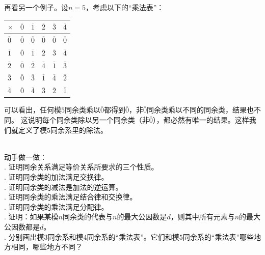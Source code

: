 \documentclass[12pt,UTF8]{ctexbook}
\begin{document}
再看另一个例子。设$n=5$，考虑以下的“乘法表”：
\begin{center}
    \begin{tabular}{ | p{2em}<{\centering} | p{2em}<{\centering} | p{2em}<{\centering} | p{2em}<{\centering} | p{2em}<{\centering} | p{2em}<{\centering} | }
        \hline
            $\times$   & $\overline{0}$ & $\overline{1}$ & $\overline{2}$ & $\overline{3}$ & $\overline{4}$ \\ [0.5ex] 
        \hline
        $\overline{0}$ & $\overline{0}$ & $\overline{0}$ & $\overline{0}$ & $\overline{0}$ & $\overline{0}$ \\  
        \hline
        $\overline{1}$ & $\overline{0}$ & $\overline{1}$ & $\overline{2}$ & $\overline{3}$ & $\overline{4}$ \\
        \hline
        $\overline{2}$ & $\overline{0}$ & $\overline{2}$ & $\overline{4}$ & $\overline{1}$ & $\overline{3}$ \\
        \hline
        $\overline{3}$ & $\overline{0}$ & $\overline{3}$ & $\overline{1}$ & $\overline{4}$ & $\overline{2}$ \\
        \hline 
        $\overline{4}$ & $\overline{0}$ & $\overline{4}$ & $\overline{3}$ & $\overline{2}$ & $\overline{1}$ \\
        \hline
    \end{tabular}
\end{center}

可以看出，任何模$5$同余类乘以$\overline{0}$都得到$\overline{0}$，非$\overline{0}$同余类乘以不同的同余类，结果也不同。
这说明每个同余类除以另一个同余类（非$\overline{0}$），都必然有唯一的结果。这样我们就定义了模$5$同余系里的除法。

\begin{xt}\label{xt:3-0-0}
    \mbox{}\\
    动手做一做：\\
    . 证明同余关系满足等价关系所要求的三个性质。 \\
    . 证明同余类的加法满足交换律。 \\
    . 证明同余类的减法是加法的逆运算。\\
    . 证明同余类的乘法满足结合律和交换律。\\
    . 证明同余类的乘法满足分配律。\\
    . 证明：如果某模$n$同余类的代表与$n$的最大公因数是$d$，则其中所有元素与$n$的最大公因数都是$d$。\\
    . 分别画出模$3$同余系和模$4$同余系的“乘法表”。它们和模$5$同余系的“乘法表”哪些地方相同，哪些地方不同？
\end{xt}
\end{document}
